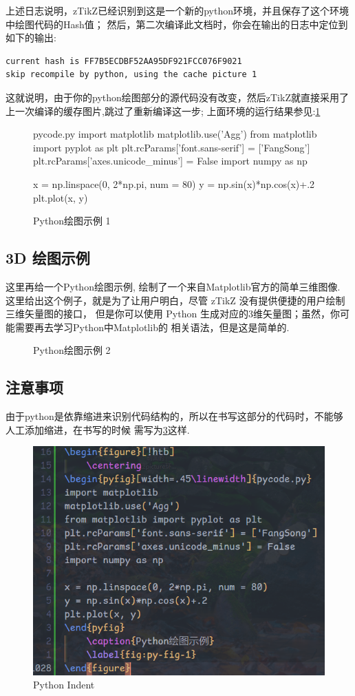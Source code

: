 上述日志说明，zTikZ已经识别到这是一个新的python环境，并且保存了这个环境中绘图代码的Hash值；
然后，第二次编译此文档时，你会在输出的日志中定位到如下的输出:
\begin{verbatim}
current hash is FF7B5ECDBF52AA95DF921FCC076F9021
skip recompile by python, using the cache picture 1
\end{verbatim}

这就说明，由于你的python绘图部分的源代码没有改变，然后zTikZ就直接采用了上一次编译的缓存图片,跳过了重新编译这一步;
上面环境的运行结果参见:\cref{fig:py-fig-1}

\begin{figure}[!htb]
    \centering
\begin{pyfig}[width=.6\linewidth]{pycode.py}
import matplotlib 
matplotlib.use('Agg')
from matplotlib import pyplot as plt
plt.rcParams['font.sans-serif'] = ['FangSong']  
plt.rcParams['axes.unicode_minus'] = False
import numpy as np

x = np.linspace(0, 2*np.pi, num = 80)
y = np.sin(x)*np.cos(x)+.2
plt.plot(x, y)
\end{pyfig}
    \caption{Python绘图示例 1}
    \label{fig:py-fig-1}
\end{figure}

\subsection{3D 绘图示例}
这里再给一个Python绘图示例, 绘制了一个来自Matplotlib官方的简单三维图像. 
这里给出这个例子，就是为了让用户明白，尽管 zTikZ 没有提供便捷的用户绘制三维矢量图的接口，
但是你可以使用 Python 生成对应的3维矢量图；虽然，你可能需要再去学习Python中Matplotlib的
相关语法，但是这是简单的.

\begin{figure}[!htb]
    \centering
    
    \caption{Python绘图示例 2}
    \label{fig:py-fig-2}
\end{figure}


\subsection{注意事项}
由于python是依靠缩进来识别代码结构的，所以在书写这部分的代码时，不能够人工添加缩进，在书写的时候
需写为\cref{fig:python-index}这样.

\begin{figure}[!htb]
  \centering
  \includegraphics[width=.4\linewidth]{./pics/pyfig_example.png}
  \caption{Python Indent}
  \label{fig:python-index}
\end{figure}

